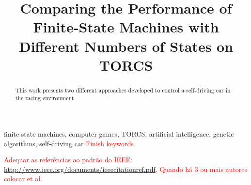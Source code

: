 \documentclass[journal]{IEEEtran}
\newcommand{\toDo}[1]{\textcolor{red}{#1}}
\begin{document}
    \title{Comparing the Performance of\\Finite-State Machines with\\Different Numbers of States on TORCS}
    
    \author{
        }
    
    \maketitle
    
    \begin{abstract}
        
        This work presents two different approaches developed to control a self-driving car in the racing environment
                
    \end{abstract}
    
    \begin{IEEEkeywords}
        
        finite state machines, computer games, TORCS, artificial intelligence, genetic algorithms, self-driving car
        \toDo{Finish keywords}
        
    \end{IEEEkeywords}
    
 
    
    
    
    
    \toDo{Adequar as referências ao padrão do IEEE: \url{http://www.ieee.org/documents/ieeecitationref.pdf}. Quando
    há 3 ou mais autores colocar et al.}
    
    
    
\end{document}
